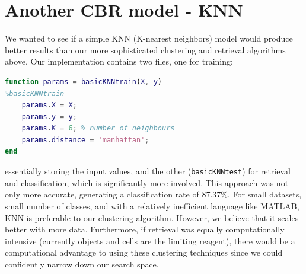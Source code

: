 \documentclass[a4paper,12pt,oneside,final]{report}
\newenvironment{changemargin}[2]{\begin{list}{}{%
\setlength{\topsep}{0pt}%
\setlength{\leftmargin}{0pt}%
\setlength{\rightmargin}{0pt}%
\setlength{\listparindent}{\parindent}%
\setlength{\itemindent}{\parindent}%
\setlength{\parsep}{0pt plus 1pt}%
\addtolength{\leftmargin}{#1}%
\addtolength{\rightmargin}{#2}%
}\item }{\end{list}}
\begin{document}
\chapter{Another CBR model - KNN}
We wanted to see if a simple KNN (K-nearest neighbors) model would produce better results than our more sophisticated clustering and retrieval algorithms above.  Our implementation contains two files, one for training:
\begin{changemargin}{-5mm}{-5mm}
\begin{lstlisting}[language=Matlab, frame=single]
function params = basicKNNtrain(X, y)
%basicKNNtrain
    params.X = X;
    params.y = y;
    params.K = 6; % number of neighbours
    params.distance = 'manhattan';
end
\end{lstlisting}
\end{changemargin}
essentially storing the input values, and the other (\verb+basicKNNtest+) for retrieval and classification, which is significantly more involved.  This approach was not only more accurate, generating a classification rate of $87.37\%$.  For small datasets, small number of classes, and with a relatively inefficient language like MATLAB, KNN is preferable to our clustering algorithm.  However, we believe that it scales better with more data.  Furthermore, if retrieval was equally computationally intensive (currently objects and cells are the limiting reagent), there would be a computational advantage to using these clustering techniques since we could confidently narrow down our search space.









\begin{appendices}

\end{appendices}
\end{document}

